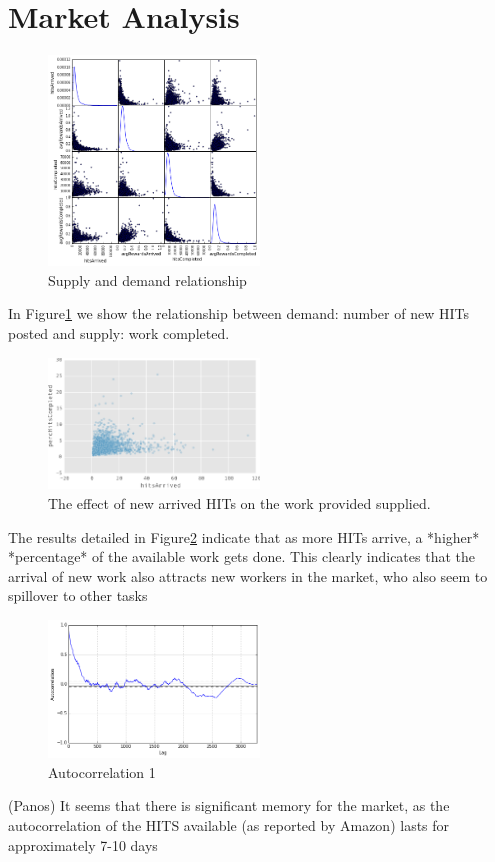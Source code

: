 \section{Market Analysis}
\label{sec:market}



\begin{figure}[htbp]
	\centering
		\includegraphics[width=0.5\textwidth]{figures/scattermatrix}
	\caption{Supply and demand relationship}
	\label{fig:scatter_matrix}
\end{figure}
In Figure\ref{fig:scatter_matrix} we show the relationship between demand: number of new HITs posted
and supply: work completed.


\begin{figure}[htbp]
	\centering
		\includegraphics[width=0.5\textwidth]{figures/percHitsCompleted}
	\caption{The effect of new arrived HITs on the work provided supplied.}
	\label{fig:perc_hits_completed}
\end{figure}
The results detailed in Figure\ref{fig:perc_hits_completed} indicate that as more HITs arrive, a *higher* *percentage* of the available work
gets done. This clearly indicates that the arrival of new work also attracts new workers
in the market, who also seem to spillover to other tasks

\begin{figure}[htbp]
	\centering
		\includegraphics[width=0.5\textwidth]{figures/autocorrelation_plot}
	\caption{Autocorrelation  1}
	\label{fig:autocorrelation1}
\end{figure}
(Panos) It seems that there is significant memory for the market, as the autocorrelation of the 
HITS available (as reported by Amazon) lasts for approximately 7-10 days

